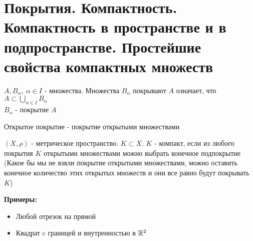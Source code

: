 \section{Покрытия. Компактность. Компактность в пространстве и в подпространстве. Простейшие свойства компактных множеств}

\begin{conj}
    $A, B_{\alpha}, \ {\alpha \in I}$ - множества. Множества $B_{\alpha}$ покрывают $A$
    означает, что $A \subset \bigcup\limits_{\alpha \in I} B_{\alpha}$ \\
    $B_{\alpha}$ - покрытие $A$
\end{conj}

\begin{conj}
    Открытое покрытие - покрытие открытыми множествами
\end{conj}

\begin{conj}
    $(X, \rho)$ - метрическое пространство. $K \subset X$.
    $K$ - компакт, если из любого покрытия $K$ открытыми множествами можно выбрать конечное подпокрытие 
    (Какое бы мы не взяли покрытие открытыми множествами, можно оставить конечное количество этих открытых множеств
    и они все равно будут покрывать $K$)
\end{conj}

\textbf{Примеры:} 

\begin{itemize}
    \item[] Любой отрезок на прямой
    \item[] Квадрат c границей и внутренностью в $\mathbb{R}^2$
\end{itemize}

